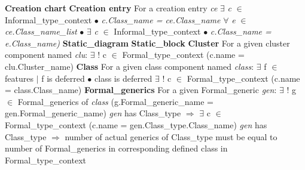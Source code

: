 \noindent\textbf{Creation chart}\newline
\indent \textbf{Creation entry}\newline
\indent\indent For a creation entry \textit{ce}\newline
\indent\indent \indent $\exists$ \textit{c} $\in$ Informal\_type\_context $\bullet$ \textit{c.Class\_name = ce.Class\_name}\newline
\indent\indent\indent $\forall$ \textit{e} $\in$ \textit{ce.Class\_name\_list} $\bullet$ $\exists$ \textit{c} $\in$ Informal\_type\_context $\bullet$ \textit{c.Class\_name = e.Class\_name)}\newline
\textbf{Static\_diagram}\newline
\indent \textbf{Static\_block}\newline
\indent \indent \textbf{Cluster}\newline
\indent \indent \indent For a given cluster component named \textit{clu}:\newline
\indent \indent \indent \indent $\exists$ ! c $\in$ Formal\_type\_context (c.name = clu.Cluster\_name)\newline
\indent \indent \textbf{Class}\newline
\indent \indent \indent For a given class component named \textit{class}:\newline
\indent \indent \indent \indent $\exists$ f $\in$ features $\mid$ f is deferred $\bullet$ class is deferred\newline
\indent \indent \indent \indent $\exists$ ! c $\in$ Formal\_type\_context (c.name = class.Class\_name)\newline
\indent \indent \indent \textbf{Formal\_generics}\newline
\indent \indent \indent \indent For a given Formal\_generic \textit{gen}:\newline
\indent \indent \indent \indent \indent $\exists$ ! g $\in$ Formal\_generics of \textit{class} (g.Formal\_generic\_name = gen.Formal\_generic\_name)\newline
\indent \indent \indent \indent \indent \textit{gen} has Class\_type $\Rightarrow$ $\exists$ c $\in$ Formal\_type\_context (c.name = gen.Class\_type.Class\_name)\newline\newline
\indent \indent \indent \indent \indent \textit{gen} has Class\_type $\Rightarrow$ number of actual generics of Class\_type must be equal to \newline 
\indent\indent\indent\indent\indent number of Formal\_generics in corresponding defined class in Formal\_type\_context\newline
